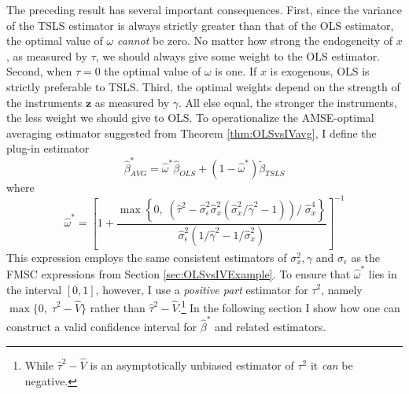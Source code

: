 The preceding result has several important consequences. 
First, since the variance of the TSLS estimator is always strictly greater than that of the OLS estimator, the optimal value of $\omega$ \emph{cannot} be zero. 
No matter how strong the endogeneity of $x$,
as measured by $\tau$, we should always give some weight to the OLS estimator. 
Second, when $\tau = 0$ the optimal value of $\omega$ is one. If $x$ is exogenous, OLS is strictly preferable to TSLS. 
Third, the optimal weights depend on the strength of the instruments $\mathbf{z}$ as measured by $\gamma$.
All else equal, the stronger the instruments, the less weight we should give to OLS.
To operationalize the AMSE-optimal averaging estimator suggested from Theorem \ref{thm:OLSvsIVavg}, I define the plug-in estimator 
\begin{equation}
	\widehat{\beta}^*_{AVG} = \widehat{\omega}^* \widehat{\beta}_{OLS} + (1 - \widehat{\omega}^*)\widetilde{\beta}_{TSLS}
	\label{eq:OLSvsIV_AVG1}
\end{equation}
where
\begin{equation}
\widehat{\omega }^* = \left[1 + \frac{\max \left\{0, \; \left(\widehat{\tau}^2 - \widehat{\sigma}_\epsilon^2\widehat{\sigma}_x^2  \left(\widehat{\sigma}_x^2/\widehat{\gamma}^2 - 1 \right) \right)/\;\widehat{\sigma}_x^4 \right\}}{\widehat{\sigma}_\epsilon^2 (1/\widehat{\gamma}^2 - 1/\widehat{\sigma}_x^2)}\right]^{-1}
	\label{eq:OLSvsIV_AVG2}
\end{equation}
This expression employs the same consistent estimators of $\sigma_x^2, \gamma$ and $\sigma_{\epsilon}$ as the FMSC expressions from Section \ref{sec:OLSvsIVExample}.
To ensure that $\widehat{\omega}^*$ lies in the interval $[0,1]$, however, I use a \emph{positive part} estimator for $\tau^2$, namely $\max\{0, \; \widehat{\tau}^2 - \widehat{V}\}$ rather than $\widehat{\tau}^2 - \widehat{V}$.\footnote{While $\widehat{\tau}^2 - \widehat{V}$ is an asymptotically unbiased estimator of $\tau^2$ it \emph{can} be negative.}
In the following section I show how one can construct a valid confidence interval for $\widehat{\beta}^*$ and related estimators.

